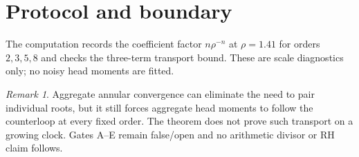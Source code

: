 \documentclass[11pt]{article}
\theoremstyle{remark}\newtheorem{remark}[theorem]{Remark}
\begin{document}
\section{Protocol and boundary}
The computation records the coefficient factor $n\rho^{-n}$ at
$\rho=1.41$ for orders $2,3,5,8$ and checks the three-term transport bound.
These are scale diagnostics only; no noisy head moments are fitted.

\begin{remark}
Aggregate annular convergence can eliminate the need to pair individual
roots, but it still forces aggregate head moments to follow the counterloop
at every fixed order.  The theorem does not prove such transport on a
growing clock.  Gates A--E remain false/open and no arithmetic divisor or RH
claim follows.
\end{remark}
\end{document}
